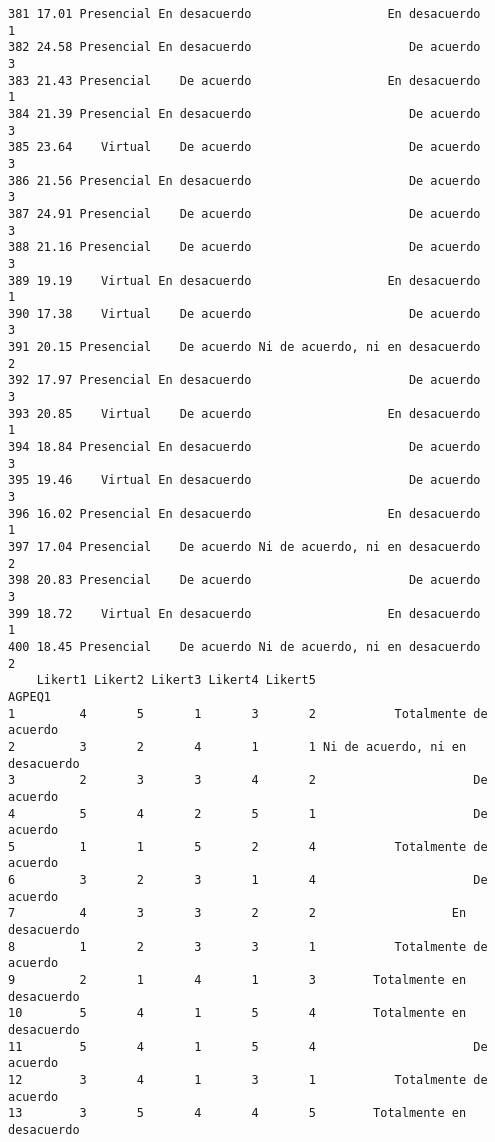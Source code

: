 \documentclass[
  letterpaper,
  DIV=11,
  numbers=noendperiod]{scrartcl}
\begin{document}
\begin{verbatim}
381 17.01 Presencial En desacuerdo                   En desacuerdo           1
382 24.58 Presencial En desacuerdo                      De acuerdo           3
383 21.43 Presencial    De acuerdo                   En desacuerdo           1
384 21.39 Presencial En desacuerdo                      De acuerdo           3
385 23.64    Virtual    De acuerdo                      De acuerdo           3
386 21.56 Presencial En desacuerdo                      De acuerdo           3
387 24.91 Presencial    De acuerdo                      De acuerdo           3
388 21.16 Presencial    De acuerdo                      De acuerdo           3
389 19.19    Virtual En desacuerdo                   En desacuerdo           1
390 17.38    Virtual    De acuerdo                      De acuerdo           3
391 20.15 Presencial    De acuerdo Ni de acuerdo, ni en desacuerdo           2
392 17.97 Presencial En desacuerdo                      De acuerdo           3
393 20.85    Virtual    De acuerdo                   En desacuerdo           1
394 18.84 Presencial En desacuerdo                      De acuerdo           3
395 19.46    Virtual En desacuerdo                      De acuerdo           3
396 16.02 Presencial En desacuerdo                   En desacuerdo           1
397 17.04 Presencial    De acuerdo Ni de acuerdo, ni en desacuerdo           2
398 20.83 Presencial    De acuerdo                      De acuerdo           3
399 18.72    Virtual En desacuerdo                   En desacuerdo           1
400 18.45 Presencial    De acuerdo Ni de acuerdo, ni en desacuerdo           2
    Likert1 Likert2 Likert3 Likert4 Likert5                          AGPEQ1
1         4       5       1       3       2           Totalmente de acuerdo
2         3       2       4       1       1 Ni de acuerdo, ni en desacuerdo
3         2       3       3       4       2                      De acuerdo
4         5       4       2       5       1                      De acuerdo
5         1       1       5       2       4           Totalmente de acuerdo
6         3       2       3       1       4                      De acuerdo
7         4       3       3       2       2                   En desacuerdo
8         1       2       3       3       1           Totalmente de acuerdo
9         2       1       4       1       3        Totalmente en desacuerdo
10        5       4       1       5       4        Totalmente en desacuerdo
11        5       4       1       5       4                      De acuerdo
12        3       4       1       3       1           Totalmente de acuerdo
13        3       5       4       4       5        Totalmente en desacuerdo

\end{verbatim}
\end{document}
